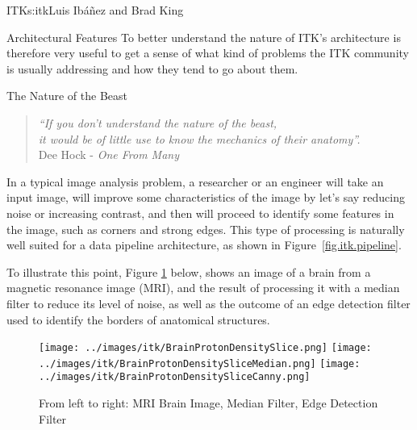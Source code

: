 \begin{aosachapter}{ITK}{s:itk}{Luis Ib\'{a}\~{n}ez and Brad King}
\begin{aosasect1}{Architectural Features}
To better understand the nature of ITK's architecture is therefore very useful
to get a sense of what kind of problems the ITK community is usually addressing
and how they tend to go about them.

\begin{aosasect2}{The Nature of the Beast}

\begin{center}
\begin{quotation}
\emph{
``If you don't understand the nature of the beast,\\
it would be of little use to know the mechanics of their anatomy''.\\
}
\hfill Dee Hock - \emph{One From Many}
\end{quotation}
\end{center}

In a typical image analysis problem, a researcher or an engineer will take an
input image, will improve some characteristics of the image by let's say
reducing noise or increasing contrast, and then will proceed to identify some
features in the image, such as corners and strong edges. This type of
processing is naturally well suited for a data pipeline architecture, as
shown in Figure~\ref{fig.itk.pipeline}.

To illustrate this point, Figure \ref{fig.itk.brim} below, shows an image of a
brain from a magnetic resonance image (MRI), and the result of processing it
with a median filter to reduce its level of noise, as well as the outcome of an
edge detection filter used to identify the borders of anatomical structures.


%
%
%
\begin{figure}[h!]
\centering
\texttt{[image: ../images/itk/BrainProtonDensitySlice.png]}
\texttt{[image: ../images/itk/BrainProtonDensitySliceMedian.png]}
\texttt{[image: ../images/itk/BrainProtonDensitySliceCanny.png]}
\caption{From left to right: MRI Brain Image, Median Filter, Edge Detection Filter}
\label{fig.itk.brim}
\end{figure}


\end{aosasect2}
\end{aosasect1}
\end{aosachapter}
